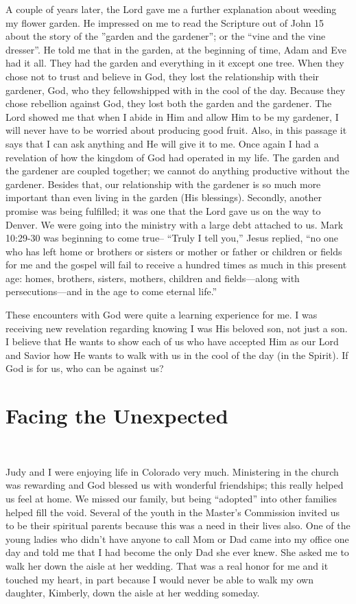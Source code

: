 \documentclass[twoside, 12pt]{book}
\begin{document}
A couple of years later, the Lord gave me a further explanation about weeding my flower garden. He impressed on me to read the Scripture out of John 15 about the story of the ”garden and the gardener”; or the “vine and the vine dresser”. He told me that in the garden, at the beginning of time, Adam and Eve had it all. They had the garden and everything in it except one tree. When they chose not to trust and believe in God, they lost the relationship with their gardener, God, who they fellowshipped with in the cool of the day. Because they chose rebellion against God, they lost both the garden and the gardener. The Lord showed me that when I abide in Him and allow Him to be my gardener, I will never have to be worried about producing good fruit. Also, in this passage it says that I can ask anything and He will give it to me. Once again I had a revelation of how the kingdom of God had operated in my life. The garden and the gardener are coupled together; we cannot do anything productive without the gardener. Besides that, our relationship with the gardener is so much more important than even living in the garden (His blessings).
Secondly, another promise was being fulfilled; it was one that the Lord gave us on the way to Denver. We were going into the ministry with a large debt attached to us. Mark 10:29-30 was beginning to come true-- “Truly I tell you,” Jesus replied, “no one who has left home or brothers or sisters or mother or father or children or fields for me and the gospel will fail to receive a hundred times as much in this present age: homes, brothers, sisters, mothers, children and fields—along with persecutions—and in the age to come eternal life.”

These encounters with God were quite a learning experience for me. I was receiving new revelation regarding knowing I was His beloved son, not just a son. I believe that He wants to show each of us who have accepted Him as our Lord and Savior how He wants to walk with us in the cool of the day (in the Spirit). If God is for us, who can be against us?


\chapter{Facing the Unexpected}
\

Judy and I were enjoying life in Colorado very much. Ministering in the church was rewarding and God blessed us with wonderful friendships; this really helped us feel at home. We missed our family, but being “adopted” into other families helped fill the void. Several of the youth in the Master’s Commission invited us to be their spiritual parents because this was a need in their lives also. One of the young ladies who didn’t have anyone to call Mom or Dad came into my office one day and told me that I had become the only Dad she ever knew. She asked me to walk her down the aisle at her wedding. That was a real honor for me and it touched my heart, in part because I would never be able to walk my own daughter, Kimberly, down the aisle at her wedding someday.
\end{document}
